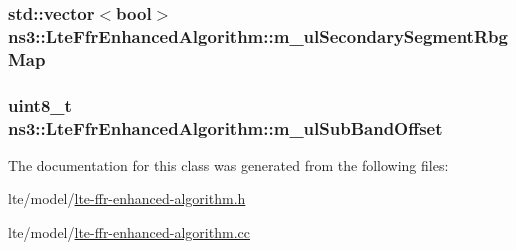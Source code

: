 \subsubsection[{\texorpdfstring{m\+\_\+ul\+Secondary\+Segment\+Rbg\+Map}{m_ulSecondarySegmentRbgMap}}]{\setlength{\rightskip}{0pt plus 5cm}std\+::vector$<$bool$>$ ns3\+::\+Lte\+Ffr\+Enhanced\+Algorithm\+::m\+\_\+ul\+Secondary\+Segment\+Rbg\+Map\hspace{0.3cm}{\ttfamily [private]}}\hypertarget{classns3_1_1LteFfrEnhancedAlgorithm_aedd739afe07f7716e660f175b05c31f7}{}\label{classns3_1_1LteFfrEnhancedAlgorithm_aedd739afe07f7716e660f175b05c31f7}
\subsubsection[{\texorpdfstring{m\+\_\+ul\+Sub\+Band\+Offset}{m_ulSubBandOffset}}]{\setlength{\rightskip}{0pt plus 5cm}uint8\+\_\+t ns3\+::\+Lte\+Ffr\+Enhanced\+Algorithm\+::m\+\_\+ul\+Sub\+Band\+Offset\hspace{0.3cm}{\ttfamily [private]}}\hypertarget{classns3_1_1LteFfrEnhancedAlgorithm_a063de191d200ce49e14493870f137f23}{}\label{classns3_1_1LteFfrEnhancedAlgorithm_a063de191d200ce49e14493870f137f23}


The documentation for this class was generated from the following files\+:\begin{DoxyCompactItemize}
\item 
lte/model/\hyperlink{lte-ffr-enhanced-algorithm_8h}{lte-\/ffr-\/enhanced-\/algorithm.\+h}\item 
lte/model/\hyperlink{lte-ffr-enhanced-algorithm_8cc}{lte-\/ffr-\/enhanced-\/algorithm.\+cc}\end{DoxyCompactItemize}
